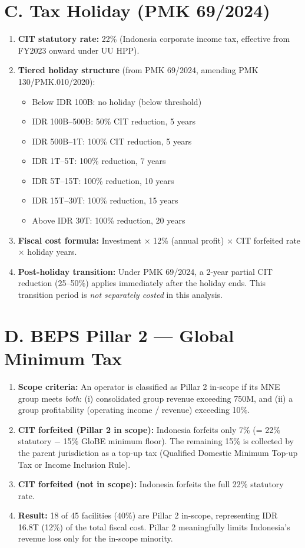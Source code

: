 \documentclass[a4paper,10pt]{article}
\begin{document}
\section{C. Tax Holiday (PMK 69/2024)}
\begin{enumerate}[resume]
  \item \textbf{CIT statutory rate:} 22\% (Indonesia corporate income tax, effective from FY2023 onward under UU HPP).
  \item \textbf{Tiered holiday structure} (from PMK 69/2024, amending PMK 130/PMK.010/2020):
  \begin{itemize}
    \item Below IDR 100B: no holiday (below threshold)
    \item IDR 100B--500B: 50\% CIT reduction, 5 years
    \item IDR 500B--1T: 100\% CIT reduction, 5 years
    \item IDR 1T--5T: 100\% reduction, 7 years
    \item IDR 5T--15T: 100\% reduction, 10 years
    \item IDR 15T--30T: 100\% reduction, 15 years
    \item Above IDR 30T: 100\% reduction, 20 years
  \end{itemize}
  \item \textbf{Fiscal cost formula:} Investment $\times$ 12\% (annual profit) $\times$ CIT forfeited rate $\times$ holiday years.
  \item \textbf{Post-holiday transition:} Under PMK 69/2024, a 2-year partial CIT reduction (25--50\%) applies immediately after the holiday ends. This transition period is \textit{not separately costed} in this analysis.
\end{enumerate}

\section{D. BEPS Pillar 2 --- Global Minimum Tax}
\begin{enumerate}[resume]
  \item \textbf{Scope criteria:} An operator is classified as Pillar 2 in-scope if its MNE group meets \textit{both}: (i) consolidated group revenue exceeding \texteuro{}750M, and (ii) a group profitability (operating income / revenue) exceeding 10\%.
  \item \textbf{CIT forfeited (Pillar 2 in scope):} Indonesia forfeits only 7\% (= 22\% statutory $-$ 15\% GloBE minimum floor). The remaining 15\% is collected by the parent jurisdiction as a top-up tax (Qualified Domestic Minimum Top-up Tax or Income Inclusion Rule).
  \item \textbf{CIT forfeited (not in scope):} Indonesia forfeits the full 22\% statutory rate.
  \item \textbf{Result:} 18 of 45 facilities (40\%) are Pillar 2 in-scope, representing IDR 16.8T (12\%) of the total fiscal cost. Pillar 2 meaningfully limits Indonesia's revenue loss only for the in-scope minority.
\end{enumerate}
\end{document}
